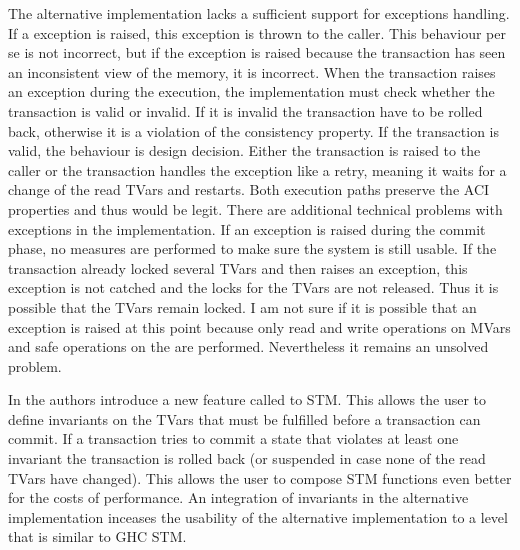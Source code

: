 The alternative implementation lacks a sufficient support for exceptions handling. If a exception is
raised, this exception is thrown to the caller. This behaviour per se is not incorrect, but if the 
exception is raised because the transaction has seen an inconsistent view of the memory, it is 
incorrect. When the transaction raises an exception during the execution, the implementation must 
check whether the transaction is valid or invalid. If it is invalid the transaction have to be rolled 
back, otherwise it is a violation of the consistency property. If the transaction is valid, the 
behaviour is design decision. Either the transaction is raised to the caller or the transaction 
handles the exception like a retry, meaning it waits for a change of the read TVars and restarts.
Both execution paths preserve the ACI properties and thus would be legit. There are additional 
technical problems with exceptions in the implementation. If an exception is raised during the 
commit phase, no measures are performed to make sure the system 
is still usable. If the transaction already locked several TVars and then raises an exception, this 
exception is not catched and the locks for the TVars are not released. Thus it is possible that 
the TVars remain locked. I am not sure if it is possible that an exception is raised at this point
because only read and write operations on MVars and safe operations on the  are performed.
Nevertheless it remains an unsolved problem.

In \parencite{invariants} the authors introduce a new feature called  to STM.
This allows the user to define invariants on the TVars that must be fulfilled before a transaction
can commit. If a transaction tries to commit a state that violates at least one invariant the 
transaction is rolled back (or suspended in case none of the read TVars have changed). This allows
the user to compose STM functions even better for the costs of performance. An integration of 
invariants in the alternative implementation inceases the usability of the alternative implementation
to a level that is similar to GHC STM.

